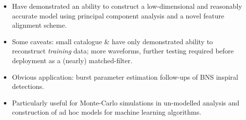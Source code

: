 \documentclass[a0,landscape]{a0poster}
\begin{document}
\begin{multicols}{4}
\begin{itemize}
\item Have demonstrated an ability to construct a low-dimensional and reasonably
    accurate model using principal component analysis and a novel feature
    alignment scheme.
\item Some caveats: small catalogue \& have only demonstrated ability to
    reconstruct \emph{training} data; more waveforms, further testing required
    before deployment as a (nearly) matched-filter.
\item Obvious application: burst parameter estimation follow-ups of BNS inspiral
    detections.
\item Particularly useful for Monte-Carlo simulations in un-modelled analysis
    and construction of ad hoc models for machine learning algorithms.
\end{itemize}




\footnotesize{
}





\end{multicols}
\end{document}

